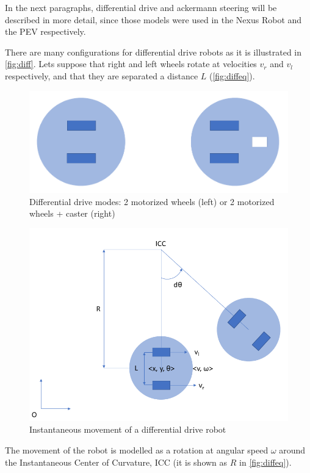 In the next paragraphs, differential drive and ackermann steering will be described in more detail, since those models were used in the Nexus Robot and the PEV respectively.

 There are many configurations for differential drive robots as it is illustrated in \autoref{fig:diff}. Lets suppose that right and left wheels rotate at velocities $v_r$ and $v_l$ respectively, and that they are separated a distance $L$ (\autoref{fig:diffeq}).

\begin{figure}[htb]
  \centering
  \includegraphics[width=.7\linewidth]{pictures/02/diff}
  \caption[Differential drive modes]{Differential drive modes: 2 motorized wheels (left) or 2 motorized wheels + caster (right)}
  \label{fig:diff}
\end{figure}

\begin{figure}[htb]
  \centering
  \includegraphics[width=.9\linewidth]{pictures/02/diffeq}
  \caption{Instantaneous movement of a differential drive robot}
  \label{fig:diffeq}
\end{figure}

The movement of the robot is modelled as a rotation at angular speed $\omega$ around the Instantaneous Center of Curvature, ICC (it is shown as $R$ in \autoref{fig:diffeq}).

